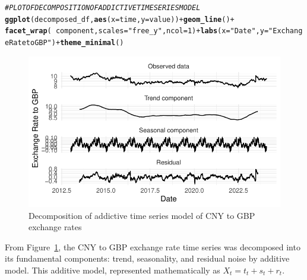 \documentclass{article}\usepackage[]{graphicx}\usepackage[]{xcolor}
\makeatletter
\def\maxwidth{ %
  \ifdim\Gin@nat@width>\linewidth
    \linewidth
  \else
    \Gin@nat@width
  \fi
}
\newcommand{\hlnum}[1]{\textcolor[rgb]{0.686,0.059,0.569}{#1}}%
\newcommand{\hlstr}[1]{\textcolor[rgb]{0.192,0.494,0.8}{#1}}%
\newcommand{\hlcom}[1]{\textcolor[rgb]{0.678,0.584,0.686}{\textit{#1}}}%
\newcommand{\hlopt}[1]{\textcolor[rgb]{0,0,0}{#1}}%
\newcommand{\hlstd}[1]{\textcolor[rgb]{0.345,0.345,0.345}{#1}}%
\newcommand{\hlkwc}[1]{\textcolor[rgb]{0.333,0.667,0.333}{#1}}%
\newcommand{\hlkwd}[1]{\textcolor[rgb]{0.737,0.353,0.396}{\textbf{#1}}}%
\newenvironment{kframe}{%
 \def\at@end@of@kframe{}%
 \ifinner\ifhmode%
  \def\at@end@of@kframe{\end{minipage}}%
  \begin{minipage}{\columnwidth}%
 \fi\fi%
 \def\FrameCommand##1{\hskip\@totalleftmargin \hskip-\fboxsep
 \colorbox{shadecolor}{##1}\hskip-\fboxsep
     \hskip-\linewidth \hskip-\@totalleftmargin \hskip\columnwidth}%
 \MakeFramed {\advance\hsize-\width
   \@totalleftmargin\z@ \linewidth\hsize
   \@setminipage}}%
 {\par\unskip\endMakeFramed%
 \at@end@of@kframe}
\newenvironment{knitrout}{}{} %
\numberwithin{equation}{section}
\makeatother
\begin{document}
\begin{knitrout}\scriptsize
{}\color{fgcolor}\begin{kframe}
\begin{alltt}
\hlcom{# PLOT OF DECOMPOSITION OF ADDICTIVE TIME SERIES MODEL}
\hlkwd{ggplot}\hlstd{(decomposed_df,} \hlkwd{aes}\hlstd{(}\hlkwc{x} \hlstd{= time,} \hlkwc{y} \hlstd{= value))} \hlopt{+} \hlkwd{geom_line}\hlstd{()} \hlopt{+}
  \hlkwd{facet_wrap}\hlstd{(}\hlopt{~}\hlstd{component,} \hlkwc{scales} \hlstd{=} \hlstr{"free_y"}\hlstd{,} \hlkwc{ncol} \hlstd{=} \hlnum{1}\hlstd{)} \hlopt{+} \hlkwd{labs}\hlstd{(}\hlkwc{x} \hlstd{=} \hlstr{"Date"}\hlstd{,}\hlkwc{y} \hlstd{=} \hlstr{"Exchange Rate to GBP"}\hlstd{)} \hlopt{+} \hlkwd{theme_minimal}\hlstd{()}
\end{alltt}
\end{kframe}\begin{figure}[H]

{\centering \includegraphics[width=\maxwidth]{figure/beamer-decomposition_of_time_series-1} 

}

\caption[Decomposition of addictive time series model of CNY to GBP exchange rates]{Decomposition of addictive time series model of CNY to GBP exchange rates}\label{fig:decomposition of time series}
\end{figure}

\end{knitrout}

\noindent
From Figure~\ref{fig:decomposition of time series}, the CNY to GBP exchange rate time series was decomposed into its fundamental components: trend, seasonality, and residual noise by additive model. This additive model, represented mathematically as $X_t = t_t + s_t + r_t$.\\
\end{document}

